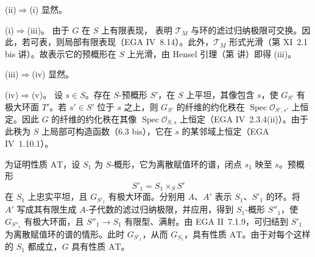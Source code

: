 
\textup{(ii)}\(\Rightarrow\)\textup{(i)} 显然。

\textup{(i)}\(\Rightarrow\)\textup{(iii)}。
由于 \(G\) 在 \(S\) 上有限表现， 表明 \(\mathcal T_M\) 与环的滤过归纳极限可交换。因此，若可表，则局部有限表现（EGA IV~8.14）。此外，\(\mathcal T_M\) 形式光滑（第 XI~2.1 bis 讲）。故表示它的预概形在 \(S\) 上光滑，由 Hensel 引理（第  讲）即得 \textup{(iii)}。

\textup{(iii)}\(\Rightarrow\)\textup{(iv)} 显然。

\textup{(iv)}\(\Rightarrow\)\textup{(v)}。
设 \(s\in S\)。存在 \(S\)-预概形 \(S'\)，在 \(S\) 上平坦，其像包含 \(s\)，使 \(G_{S'}\) 有极大环面 \(T'\)。若 \(s'\in S'\) 位于 \(s\) 之上，则 \(G_{S'}\) 的纤维的约化秩在 \(\operatorname{Spec}\mathcal O_{S',s'}\) 上恒定。因此 \(G\) 的纤维的约化秩在其像 \(\operatorname{Spec}\mathcal O_{S,s}\) 上恒定（EGA IV~2.3.4(ii)）。由于此秩为 \(S\) 上局部可构造函数（6.3 bis），它在 \(s\) 的某邻域上恒定（EGA IV~1.10.1）。

为证明性质 \(\mathrm{AT}\)，设 \(S_1\) 为 \(S\)-概形，它为离散赋值环的谱，闭点 \(s_1\) 映至 \(s\)。预概形
\[
  S'_1=S_1\times_S S'
\]
在 \(S_1\) 上忠实平坦，且 \(G_{S'_1}\) 有极大环面。分别用 \(A\)、\(A'\) 表示 \(S_1\)、\(S'_1\) 的环。将 \(A'\) 写成其有限生成 \(A\)-子代数的滤过归纳极限，并应用，得到 \(S_1\)-概形 \(S''_1\)，使 \(G_{S''_1}\) 有极大环面，且 \(S''_1\to S_1\) 有限型、满射。由 EGA II~7.1.9，可归结到 \(S'_1\) 为离散赋值环的谱的情形。此时 \(G_{S'_1}\)，从而 \(G_{S_1}\)，具有性质 \(\mathrm{AT}\)。由于对每个这样的 \(S_1\) 都成立，\(G\) 具有性质 \(\mathrm{AT}\)。

